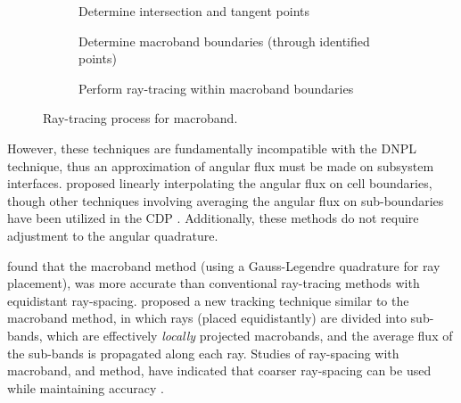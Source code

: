 {{{        \begin{figure}[!ht]
          \centering
          \begin{subfigure}[t]{0.33\linewidth}
            \centering
            \def\svgwidth{0.95\linewidth}
            
            \caption{Determine intersection and tangent points}
          \end{subfigure}%
          \hfill
          \begin{subfigure}[t]{0.33\linewidth}
            \centering
            \def\svgwidth{0.95\linewidth}
            
            \caption{Determine macroband boundaries (through identified points)}
          \end{subfigure}%
          \hfill
          \begin{subfigure}[t]{0.33\linewidth}
            \centering
            \def\svgwidth{0.95\linewidth}
            
            \caption{Perform ray-tracing within macroband boundaries}
          \end{subfigure}
          \caption{Ray-tracing process for macroband.}
          \label{fig:RT:Macroband Process}
        \end{figure}

        However, these techniques are fundamentally incompatible with the \ac{DNPL} technique, thus an approximation of angular flux must be made on subsystem interfaces.
        \citet{Yamamoto2005} proposed linearly interpolating the angular flux on cell boundaries, though other techniques involving averaging the angular flux on sub-boundaries have been utilized in the \ac{CDP} \cite{Liu2014}.
        Additionally, these methods do not require adjustment to the angular quadrature.

        \citet{Yamamoto2005} found that the macroband method (using a Gauss-Legendre quadrature for ray placement), was more accurate than conventional ray-tracing methods with equidistant ray-spacing.
        \citet{Fevotte2007} proposed a new tracking technique similar to the macroband method, in which rays (placed equidistantly) are divided into sub-bands, which are effectively \emph{locally} projected macrobands, and the average flux of the sub-bands is propagated along each ray.
        Studies of ray-spacing with macroband, and  method, have indicated that coarser ray-spacing can be used while maintaining accuracy \cite{Yamamoto2005,Fevotte2007,Yamamoto2008}.

}}}
